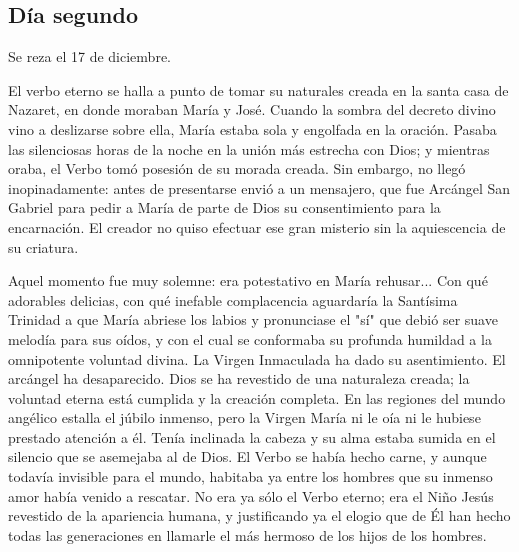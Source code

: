 \documentclass[spanish,utf8,twocolumn]{chlart}
\newenvironment{summary}{\begingroup
	\small\sffamily\itshape%
	\setlength{\leftskip}{3em}\setlength{\rightskip}{3em}\noindent
	}{\par\endgroup}
\newenvironment{lectura}{\begingroup\color{lector}}{\endgroup\par}
\begin{document}
\subsection*{Día segundo}
\begin{summary}
Se reza el 17 de diciembre.
\end{summary}
\begin{lectura}
El verbo eterno se halla a punto de tomar su naturales creada en la
santa casa de Nazaret, en donde moraban María y José.
Cuando la sombra del decreto divino vino a deslizarse sobre ella, María
estaba sola y engolfada en la oración.
Pasaba las silenciosas horas de la noche en la unión más estrecha con
Dios; y mientras oraba, el Verbo tomó posesión de su morada creada.
Sin embargo, no llegó inopinadamente:
antes de presentarse envió a un mensajero, que fue Arcángel San Gabriel
para pedir a María de parte de Dios su consentimiento para la encarnación.
El creador no quiso efectuar ese gran misterio sin la aquiescencia de su
criatura.

Aquel momento fue muy solemne:
era potestativo en María rehusar...
Con qué adorables delicias, con qué inefable complacencia aguardaría la
Santísima Trinidad a que María abriese los labios y pronunciase el "sí"
que debió ser suave melodía para sus oídos, y con el cual se conformaba
su profunda humildad a la omnipotente voluntad divina.
La Virgen Inmaculada ha dado su asentimiento.
El arcángel ha desaparecido.
Dios se ha revestido de una naturaleza creada; la voluntad eterna está
cumplida y la creación completa.
En las regiones del mundo angélico estalla el júbilo inmenso, pero la
Virgen María ni le oía ni le hubiese prestado atención a él.
Tenía inclinada la cabeza y su alma estaba sumida en el silencio que se
asemejaba al de Dios.
El Verbo se había hecho carne, y aunque todavía invisible para el mundo,
habitaba ya entre los hombres que su inmenso amor había venido a
rescatar.
No era ya sólo el Verbo eterno; era el Niño Jesús revestido de la
apariencia humana, y justificando ya el elogio que de Él han hecho todas
las generaciones en llamarle el más hermoso de los hijos de los hombres.
\end{lectura}
\end{document}

